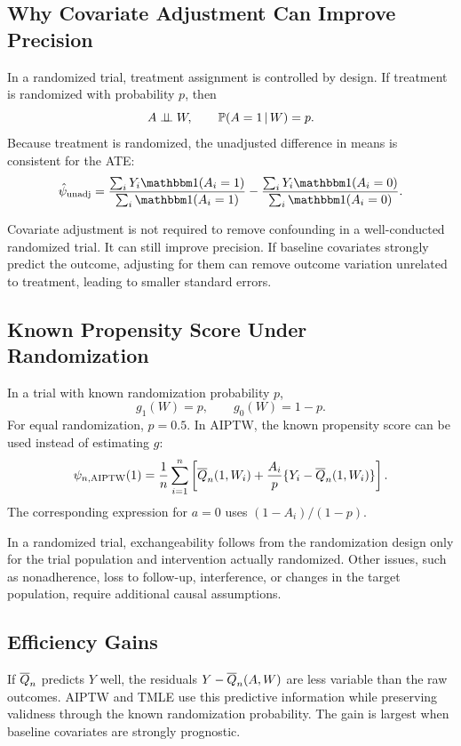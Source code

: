 \label{lec:7-6}

\subsection{Why Covariate Adjustment Can Improve Precision}

In a randomized trial, treatment assignment is controlled by design. If treatment is
randomized with probability $p$, then
\[
A\perp\!\!\!\perp W,\qquad \mathbb{P}(A=1\,\vert\, W)=p.
\]
Because treatment is randomized, the unadjusted difference in means is consistent for
the ATE:
\[
\hat\psi_{\mathrm{unadj}}
=
\frac{\sum_iY_i\ind(A_i=1)}{\sum_i\ind(A_i=1)}
-
\frac{\sum_iY_i\ind(A_i=0)}{\sum_i\ind(A_i=0)}.
\]

Covariate adjustment is not required to remove confounding in a well-conducted
randomized trial. It can still improve precision. If baseline covariates strongly
predict the outcome, adjusting for them can remove outcome variation unrelated to
treatment, leading to smaller standard errors.

\subsection{Known Propensity Score Under Randomization}

In a trial with known randomization probability $p$,
\[
g_1(W)=p,\qquad g_0(W)=1-p.
\]
For equal randomization, $p=0.5$. In AIPTW, the known propensity score can be used
instead of estimating $g$:
\[
\psi_{n,\operatorname{AIPTW}}(1)
=
\frac{1}{n}\sum_{i=1}^n
\left[
\overline{Q}_n(1,W_i)
+
\frac{A_i}{p}\{Y_i-\overline{Q}_n(1,W_i)\}
\right].
\]
The corresponding expression for $a=0$ uses $(1-A_i)/(1-p)$.

\begin{assumptionbox}
In a randomized trial, exchangeability follows from the randomization design only for
the trial population and intervention actually randomized. Other issues, such as
nonadherence, loss to follow-up, interference, or changes in the target population,
require additional causal assumptions.
\end{assumptionbox}

\subsection{Efficiency Gains}

If $\overline{Q}_n$ predicts $Y$ well, the residuals $Y-\overline{Q}_n(A,W)$ are less variable than
the raw outcomes. AIPTW and TMLE use this predictive information while preserving
validness through the known randomization probability. The gain is largest when
baseline covariates are strongly prognostic.

